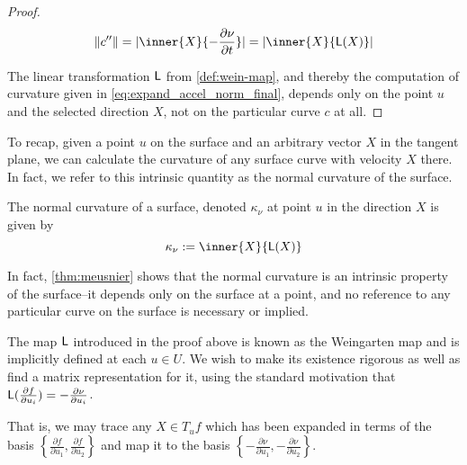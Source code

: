\begin{proof}
		\begin{equation} \label{eq:expand_accel_norm_final}
		\vnorm{c''} = \abs{\inner{X}{-\frac{\partial \nu}{\partial t}}}
                = \abs{\inner{X}{\wein(X)}}
		\end{equation}
		
	
	The linear transformation $\mathsf{L}$ from \cref{def:wein-map}, and thereby
	the computation of curvature given in \cref{eq:expand_accel_norm_final},
	depends only on the point $u$ and the selected direction $X$, not on the particular curve $c$ at all.
	\end{proof}
	To recap, given a point $u$ on the surface and an arbitrary vector $X$ in the tangent plane, we can calculate the curvature of any surface curve with velocity $X$ there. In fact, we refer to this intrinsic quantity as the normal curvature of the surface.
	
	\begin{defn} \label{def:normal-curvature}
		The normal curvature of a surface, denoted $\kappa_\nu$ at point $u$ in the direction $X$ is given by
		\[\kappa_\nu :=  \inner{X}{\wein(X)} \]
	\end{defn}
	In fact, \cref{thm:meusnier} shows that the normal curvature is an intrinsic property of the surface--it depends only on the
	surface at a point, and no reference to any particular curve on the surface is necessary or implied.
	
	
	The map $\mathsf{L}$ introduced in the proof above is known as the Weingarten map
	and is implicitly defined at each $u \in U$. 
	We wish to make its existence rigorous as well as find a matrix representation for it, using the standard motivation that $\mathsf{L}(\frac{\partial f}{\partial u_i}) = - \frac{\partial \nu}{\partial u_i}$.
	
	
	That is, we may trace any $X \in T_u f$ which has been expanded in terms of the basis 
	$\left\{\frac{\partial f}{\partial u_1} , \frac{\partial f}{\partial u_2}\right\}$
	and map it to the basis $\left\{-\frac{\partial \nu}{\partial u_1} , -\frac{\partial \nu}{\partial u_2}\right\}$. 
	
